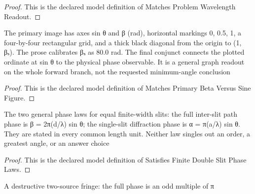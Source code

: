 \begin{proof}
  This is the declared model definition of Matches Problem Wavelength Readout.
\end{proof}
\begin{definition}
  \label{def:physics:phyx-mini-0924:phyxminiproblems-problemphyxmini0924-matchesprimarybetaversussinefigure}
  The primary image has axes sin θ and β (rad), horizontal markings 0, 0.5, 1, a four-by-four rectangular grid, and a thick black diagonal from the origin to (1, βₛ). The prose calibrates βₛ as 80.0 rad. The final conjunct connects the plotted ordinate at sin θ to the physical phase observable. It is a general graph readout on the whole forward branch, not the requested minimum-angle conclusion
\end{definition}
\begin{proof}
  This is the declared model definition of Matches Primary Beta Versus Sine Figure.
\end{proof}
\begin{definition}
  \label{def:physics:phyx-mini-0924:phyxminiproblems-problemphyxmini0924-satisfiesfinitedoubleslitphaselaws}
  The two general phase laws for equal finite-width slits: the full inter-slit path phase is β = 2π(d/λ) sin θ; the single-slit diffraction phase is α = π(a/λ) sin θ. They are stated in every common length unit. Neither law singles out an order, a greatest angle, or an answer choice
\end{definition}
\begin{proof}
  This is the declared model definition of Satisfies Finite Double Slit Phase Laws.
\end{proof}
\begin{definition}
  \label{def:physics:phyx-mini-0924:phyxminiproblems-problemphyxmini0924-isinterferenceminimum}
  A destructive two-source fringe: the full phase is an odd multiple of π
\end{definition}
